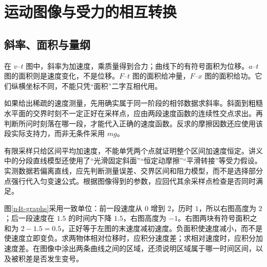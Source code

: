 \section{运动图像与受力的相互转换}
\subsection{斜率、面积与量纲}
在 $v$--$t$ 图中，斜率为加速度，乘质量得到合力；曲线下的有符号面积为位移。$a$--$t$ 图的面积则是速度变化，不是位移。$F$--$t$ 图的面积给冲量，$F$--$x$ 图的面积给功。它们纵横坐标不同，不能只凭“面积”二字互相代用。

如果给出稀疏的速度测量，先用确实属于同一阶段的相邻数据求斜率。斜面到粗糙水平面的交界时刻不一定正好在采样点，应由两段速度函数的连续性交点求出。再判断所问时刻落在哪一段，才能代入正确的速度函数。反求的摩擦因数还应使用该段实际支持力，而非无条件采用 $mg$。

有限采样只给区间平均加速度，不能单凭两个点就证明整个区间加速度恒定。讲义中的分段直线模型还使用了“光滑固定斜面”“恒定动摩擦”“平滑转接”等受力假设。实测数据若偏离直线，应先判断测量误差、交界区间和阻力模型，而不是选择部分点强行代入匀变速公式。根据图像得到的参数，应回代其余采样点检查是否同时满足。

图\ref{n4t-graphs}采用一致单位：前一段速度从 $0$ 增到 $2$，历时 $1$，所以右图高度为 $2$；后一段速度在 $1.5$ 的时间内下降 $1.5$，右图高度为 $-1$。右图两块有符号面积之和为 $2-1.5=0.5$，正好等于左图的末速度减初速度。负面积使速度减小，而不是使速度立即变负。求两物体相对位移时，应积分速度差；求相对速度时，应积分加速度差。在图像中涂出两条曲线之间的区域，还须说明区域属于哪一时间区间，以及被积差是否发生变号。

